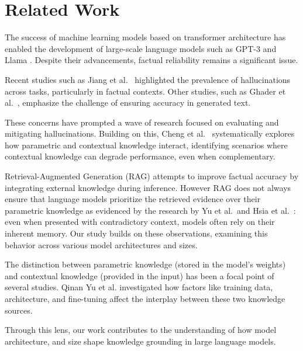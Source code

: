 \section{Related Work}

The success of machine learning models based on transformer architecture \cite{attention_is_all_you_need} has enabled the development of large-scale language models such as GPT-3 \cite{gpt3} and Llama \cite{llama}.
Despite their advancements, factual reliability remains a significant issue.

Recent studies such as Jiang et al.\ \cite{how_can_we_know} highlighted the prevalence of hallucinations across tasks, particularly in factual contexts.
Other studies, such as Ghader et al.\ \cite{can_rag_models_reason}, emphasize the challenge of ensuring accuracy in generated text.

These concerns have prompted a wave of research focused on evaluating and mitigating hallucinations.
Building on this, Cheng et al.\ \cite{understanding_the_interplay} systematically explores how parametric and contextual knowledge interact, identifying scenarios where contextual knowledge can degrade performance, even when complementary.

Retrieval-Augmented Generation (RAG) \cite{rag} attempts to improve factual accuracy by integrating external knowledge during inference.
However RAG does not always ensure that language models prioritize the retrieved evidence over their parametric knowledge as evidenced by the research by Yu et al.\ and Hsia et al.\ \cite{ragged,factual_recall}: even when presented with contradictory context, models often rely on their inherent memory.
Our study builds on these observations, examining this behavior across various model architectures and sizes.

The distinction between parametric knowledge (stored in the model's weights) and contextual knowledge (provided in the input) has been a focal point of several studies.
Qinan Yu et al. \cite{factual_recall} investigated how factors like training data, architecture, and fine-tuning affect the interplay between these two knowledge sources.

Through this lens, our work contributes to the understanding of how model architecture, and size shape knowledge grounding in large language models.
